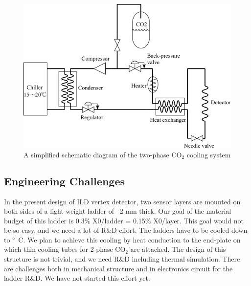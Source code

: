\begin{figure}
    \includegraphics[width=\textwidth]{VertexDetector/FPCCD/coolingSystemSchematic.png}
    \caption{A simplified schematic diagram of the two-phase $\text{CO}_2$ cooling system}
    \label{fig:FPCCD:coolingSystemSchematic}
\end{figure}

\subsection{Engineering Challenges}
    In the present design of ILD vertex detector, two sensor layers are mounted on both sides of a light-weight ladder of ~2 mm thick. Our goal of the material budget of this ladder is 0.3\% X0/ladder = 0.15\% X0/layer. This goal would not be so easy, and we need a lot of R\&D effort.
    The ladders have to be cooled down to \unit[-40]{\degree C}. We plan to achieve this cooling by heat conduction to the end-plate on which thin cooling tubes for 2-phase $\text{CO}_2$ are attached. The design of this structure is not trivial, and we need R\&D including thermal simulation.
    There are challenges both in mechanical structure and in electronics circuit for the ladder R\&D. We have not started this effort yet.
